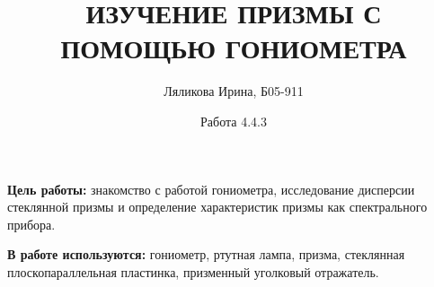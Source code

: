\documentclass[a4paper,12pt]{article}
\title{ИЗУЧЕНИЕ ПРИЗМЫ С ПОМОЩЬЮ ГОНИОМЕТРА}
\date{Работа 4.4.3}
\author{Ляликова Ирина, Б05-911}
\begin{document}
	\newcommand*{\ShowIntersection}{
		\fill 
		[name intersections={of=GraphCurve and l1, name=i, total=\t}] 
		[green!20!black, opacity=1, every node/.style={above left, black, opacity=1}] 
		\foreach \s in {1,...,\t}{(i-\s) circle (2pt)
			node [above right] {1}};
	}

\newcommand*{\ShowIntersectionn}{
	\fill 
	[name intersections={of=GraphCurve and l2, name=i, total=\t}] 
	[green!20!black, opacity=1, every node/.style={above left, black, opacity=1}] 
	\foreach \s in {1,...,\t}{(i-\s) circle (2pt)
		node [above right] {2}};
}

\newcommand*{\ShowIntersectionnn}{
	\fill 
	[name intersections={of=GraphCurve and l3, name=i, total=\t}] 
	[green!20!black, opacity=1, every node/.style={above left, black, opacity=1}] 
	\foreach \s in {1,...,\t}{(i-\s) circle (2pt)
		node [above right] {3}};
}
	\vspace{0.5 cm}
	\maketitle
	\vspace{0.5 cm}
	
	\textbf{Цель работы:} знакомство с работой гониометра, исследование дисперсии стеклянной призмы и определение характеристик призмы как спектрального прибора.
	
	\textbf{В работе используются:} гониометр, ртутная лампа, призма, стеклянная плоскопараллельная пластинка, призменный уголковый отражатель.
	
\end{document}
